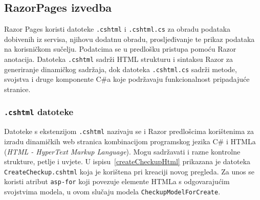 \subsection{RazorPages izvedba}
\label{subsec:izvedbaRP}

Razor Pages koristi datoteke \texttt{.cshtml} i \texttt{.cshtml.cs} za obradu podataka dobivenih iz servisa, njihovu dodatnu obradu, prosljeđivanje te prikaz podataka na korisničkom sučelju. Podatcima se u predlošku pristupa pomoću Razor anotacija. Datoteka \texttt{.cshtml} sadrži HTML strukturu i sintaksu Razor za generiranje dinamičkog sadržaja, dok datoteka \texttt{.cshtml.cs} sadrži metode, svojstva i druge komponente C\#a koje podržavaju funkcionalnost pripadajuće stranice.
\subsubsection{\texttt{.cshtml} datoteke}
\label{subsubsec:.cshtml}
Datoteke s ekstenzijom \texttt{.cshtml} nazivaju se i Razor predlošcima korištenima za izradu dinamičkih web stranica kombinacijom programskog jezika C\# i HTMLa (\textit{HTML - HyperText Markup Language}). Mogu sadržavati i razne kontrolne strukture, petlje i uvjete. U ispisu~\ref{createCheckupHtml} prikazana je datoteka \texttt{CreateCheckup.cshtml} koja je korištena pri kreaciji novog pregleda. Za unos se koristi atribut \texttt{asp-for} koji povezuje elemente HTMLa s odgovarajućim svojstvima modela, u ovom slučaju modela \texttt{CheckupModelForCreate}.

